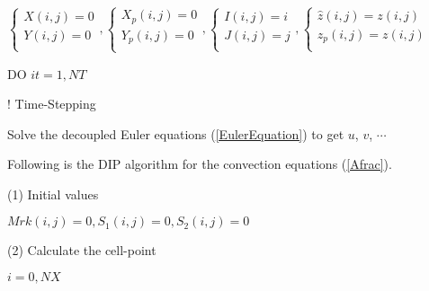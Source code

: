 \documentclass{article}
\theoremstyle{plain}\newtheorem{definition}{\sc{Definition}}
\theoremstyle{defination}\newtheorem{example}{Example}[section]
\numberwithin{equation}{section}
\numberwithin{table}{section}
\begin{document}
\hspace{0.5cm}
  \scriptsize{\color{black!80}
  \hspace{-0.7cm}
  $
  \left\{
  \begin{array}{l}
	X(i,j)=0\\
	Y(i,j)=0\\
	\end{array}
	\right.
,
\left\{
  \begin{array}{l}
	X_p(i,j)=0\\
	Y_p(i,j)=0\\
	\end{array}
	\right.
,
\left\{
  \begin{array}{l}
	I(i,j)=i\\
	J(i,j)=j\\
	\end{array}
	\right.
,
\left\{
  \begin{array}{l}
	\hat{z}(i,j)=z(i,j)\\
	z_p(i,j)=z(i,j)\\
	\end{array}
	\right.
$

\vspace{0.1cm}
\hspace{-0.48cm}
{ \color{black!60!blue!80}DO}
\color{black!80} $it=1,NT$} {\color{black!60} \hspace{2.3cm} ! Time-Stepping
  \color{black}

  \small \hspace{-0.0cm}
\hspace{-0.18cm}
Solve the decoupled Euler equations (\ref{EulerEquation}) to get $u$, $v$, $\cdots$

\hspace{-0.10cm}
Following is the DIP  algorithm for the convection equations (\ref{Afrac}).
\vspace{0.2cm}

 \normalsize (1) Initial values
  \scriptsize
  { \color{black!80}  
  \vspace{0.1cm}

  \hspace{0.5cm}
$
Mrk(i,j)=0,
S_1(i,j)=0,
S_2(i,j)=0
$
\vspace{0.1cm}

\normalsize \color{black}
(2) Calculate the cell-point
 \scriptsize 
 \vspace{0.1cm}

 { \color{black!80} $i=0,NX$}

}}
\end{document}
